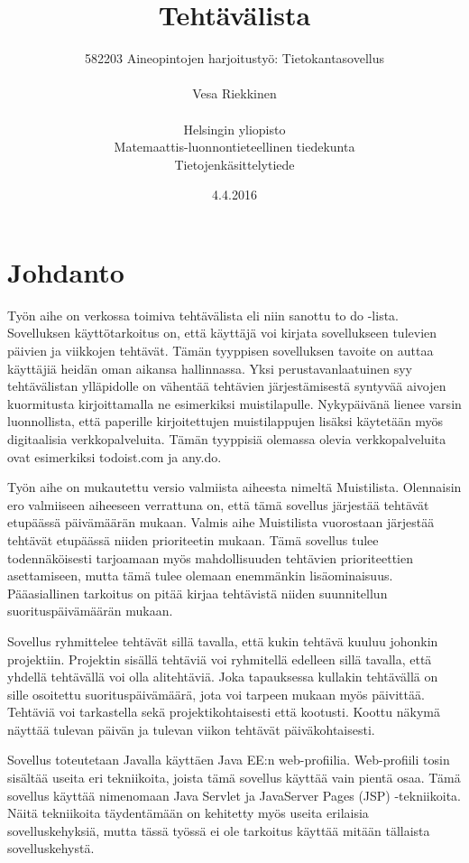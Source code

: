 \documentclass[12pt,a4paper,oneside,titlepage,pdftex]{article}
\title{Tehtävälista}
\date{4.4.2016}
\author{582203 Aineopintojen harjoitustyö: Tietokantasovellus\\ \\ Vesa Riekkinen\\ \\Helsingin yliopisto\\Matemaattis-luonnontieteellinen tiedekunta\\Tietojenkäsittelytiede}
\begin{document}
\maketitle

\setcounter{page}{1}
 
\section{Johdanto}

Työn aihe on verkossa toimiva tehtävälista eli niin sanottu to do -lista. Sovelluksen käyttötarkoitus on, että käyttäjä voi kirjata sovellukseen tulevien päivien ja viikkojen tehtävät. Tämän tyyppisen sovelluksen tavoite on auttaa käyttäjiä heidän oman aikansa hallinnassa. Yksi perustavanlaatuinen syy tehtävälistan ylläpidolle on vähentää tehtävien järjestämisestä syntyvää aivojen kuormitusta kirjoittamalla ne esimerkiksi muistilapulle. Nykypäivänä lienee varsin luonnollista, että paperille kirjoitettujen muistilappujen lisäksi käytetään myös digitaalisia verkkopalveluita. Tämän tyyppisiä olemassa olevia verkkopalveluita ovat esimerkiksi todoist.com ja any.do.

Työn aihe on mukautettu versio valmiista aiheesta nimeltä Muistilista. Olennaisin ero valmiiseen aiheeseen verrattuna on, että tämä sovellus järjestää tehtävät etupäässä päivämäärän mukaan. Valmis aihe Muistilista vuorostaan järjestää tehtävät etupäässä niiden prioriteetin mukaan. Tämä sovellus tulee todennäköisesti tarjoamaan myös mahdollisuuden tehtävien prioriteettien asettamiseen, mutta tämä tulee olemaan enemmänkin lisäominaisuus. Pääasiallinen tarkoitus on pitää kirjaa tehtävistä niiden suunnitellun suorituspäivämäärän mukaan.

Sovellus ryhmittelee tehtävät sillä tavalla, että kukin tehtävä kuuluu johonkin projektiin. Projektin sisällä tehtäviä voi ryhmitellä edelleen sillä tavalla, että yhdellä tehtävällä voi olla alitehtäviä. Joka tapauksessa kullakin tehtävällä on sille osoitettu suorituspäivämäärä, jota voi tarpeen mukaan myös päivittää. Tehtäviä voi tarkastella sekä projektikohtaisesti että kootusti. Koottu näkymä näyttää tulevan päivän ja tulevan viikon tehtävät päiväkohtaisesti.

Sovellus toteutetaan Javalla käyttäen Java EE:n web-profiilia. Web-profiili tosin sisältää useita eri tekniikoita, joista tämä sovellus käyttää vain pientä osaa. Tämä sovellus käyttää nimenomaan Java Servlet ja JavaServer Pages (JSP) -tekniikoita. Näitä tekniikoita täydentämään on kehitetty myös useita erilaisia sovelluskehyksiä, mutta tässä työssä ei ole tarkoitus käyttää mitään tällaista sovelluskehystä.
\end{document}
